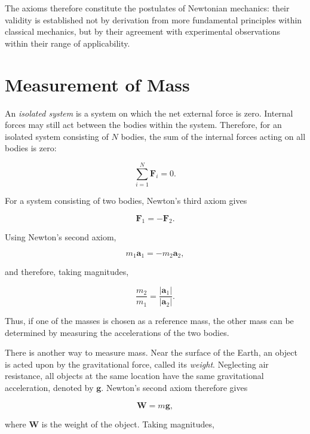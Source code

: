 \documentclass[12pt]{article}
\begin{document}
The axioms therefore constitute the postulates of Newtonian mechanics: their validity is established not by derivation from more fundamental principles within classical mechanics, but by their agreement with experimental observations within their range of applicability.


\section{Measurement of Mass}

An \emph{isolated system} is a system on which the net external force is zero. Internal forces may still act between the bodies within the system. Therefore, for an isolated system consisting of $N$ bodies, the sum of the internal forces acting on all bodies is zero:

\begin{equation}
\sum_{i=1}^{N} \mathbf{F}_i = 0.
\end{equation}

For a system consisting of two bodies, Newton's third axiom gives

\begin{equation}
\mathbf{F}_1 = -\mathbf{F}_2.
\end{equation}

Using Newton's second axiom,

\begin{equation}
m_1\mathbf{a}_1 = -m_2\mathbf{a}_2,
\end{equation}

and therefore, taking magnitudes,

\begin{equation}
\frac{m_2}{m_1} = \frac{|\mathbf{a}_1|}{|\mathbf{a}_2|}.
\end{equation}

Thus, if one of the masses is chosen as a reference mass, the other mass can be determined by measuring the accelerations of the two bodies.

There is another way to measure mass. Near the surface of the Earth, an object is acted upon by the gravitational force, called its \emph{weight}. Neglecting air resistance, all objects at the same location have the same gravitational acceleration, denoted by $\mathbf{g}$. Newton's second axiom therefore gives

\begin{equation}
\mathbf{W} = m\mathbf{g},
\end{equation}

where $\mathbf{W}$ is the weight of the object. Taking magnitudes,
\end{document}
